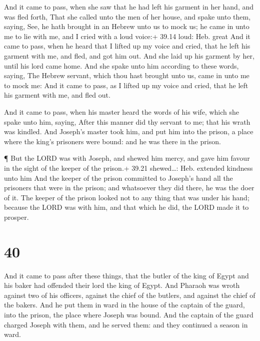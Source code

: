  And it came to pass, when she saw that he had left his
garment in her hand, and was fled forth,  That she called
unto the men of her house, and spake unto them, saying, See, he hath
brought in an Hebrew unto us to mock us; he came in unto me to lie with
me, and I cried with a loud voice:+ 39.14 loud: Heb. great 
And it came to pass, when he heard that I lifted up my voice and cried,
that he left his garment with me, and fled, and got him out.
 And she laid up his garment by her, until his lord came
home.  And she spake unto him according to these words,
saying, The Hebrew servant, which thou hast brought unto us, came in
unto me to mock me:  And it came to pass, as I lifted up my
voice and cried, that he left his garment with me, and fled out.

 And it came to pass, when his master heard the words of
his wife, which she spake unto him, saying, After this manner did thy
servant to me; that his wrath was kindled.  And Joseph's
master took him, and put him into the prison, a place where the king's
prisoners were bound: and he was there in the prison.

 ¶ But the LORD was with Joseph, and shewed him mercy, and
gave him favour in the sight of the keeper of the prison.+ 39.21
shewed\ldots: Heb. extended kindness unto him  And the
keeper of the prison committed to Joseph's hand all the prisoners that
were in the prison; and whatsoever they did there, he was the doer of
it.  The keeper of the prison looked not to any thing that
was under his hand; because the LORD was with him, and that which he
did, the LORD made it to prosper.

\hypertarget{section-39}{%
\section{40}\label{section-39}}

 And it came to pass after these things, that the butler of
the king of Egypt and his baker had offended their lord the king of
Egypt.  And Pharaoh was wroth against two of his officers,
against the chief of the butlers, and against the chief of the bakers.
 And he put them in ward in the house of the captain of the
guard, into the prison, the place where Joseph was bound. 
And the captain of the guard charged Joseph with them, and he served
them: and they continued a season in ward.


